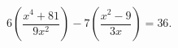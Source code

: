 \begin{ex}[type=equation]
	\begin{condition}
		$6\left(\dfrac{x^4 + 81}{9x^2}\right) - 7\left(\dfrac{x^2 - 9}{3x}\right)  = 36.$
	\end{condition}
\end{ex}